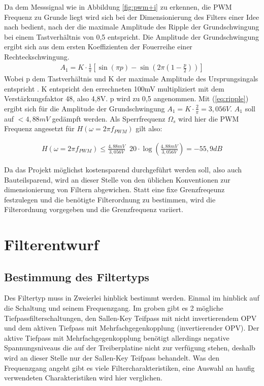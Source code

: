 Da dem Messsignal wie in Abbildung \ref{fig:pwm+i} zu erkennen, die PWM Frequenz zu Grunde liegt wird sich bei der Dimensionierung des Filters einer Idee nach \cite{Alter2008} bedient, nach der die maximale Amplitude des Ripple der Grundschwingung bei einem
Tastverhältnis von 0,5 entspricht. Die Amplitude der Grundschwingung ergibt sich aus dem ersten Koeffizienten der Fouerreihe einer Rechteckschwingung.
\begin{align}
A_1 = K\cdot \frac{1}{\pi}[\sin(\pi p)-\sin(2\pi(1-\frac{p}{2}))]
\label{eq:ripple}
\end{align}
Wobei p dem Tastverhältnis und K der maximale Amplitude des Ursprungsingals entspricht \cite{Alter2008}. K entspricht den errechneten 100mV multipliziert mit dem Verstärkungsfaktor 48, also 4,8V. p wird zu 0,5
angenommen. Mit (\ref{eq:ripple}) ergibt sich für die Amplitude der Grundschwingung $ A_1 = K\cdot \frac{2}{\pi} = 3,056V$. $A_1$ soll auf $ < 4,88mV$ gedämpft werden.
Als Sperrfrequenz $\Omega_s $ wird hier die PWM Frequenz angesetzt für $H(\omega=2\pi f_{PWM})$ gilt also:

\begin{align}
H(\omega=2\pi f_{PWM}) \le \frac{4,88mV}{3,056V} \mathop{\hat{=}} 20\cdot\log(\frac{4,88mV}{3,056V})= -55,9 dB
\label{eq:daempfung}
\end{align}

Da das Projekt möglichst kostensparend durchgeführt werden soll, also auch Bauteilsparend, wird an dieser Stelle von den üblichen Konventionen zur dimensionierung von Filtern abgewichen.
Statt eine fixe Grenzfreqeunz festzulegen und die benötigte Filterordnung zu bestimmen, wird die Filterordnung vorgegeben und die Grenzfrequenz variiert.

\section{Filterentwurf}

\subsection{Bestimmung des Filtertyps}

Des Filtertyp muss in Zweierlei hinblick bestimmt werden. Einmal im hinblick auf die Schaltung und seinem Frequenzgang.
Im groben gibt es 2 mögliche Tiefpassfilterschaltungen, den Sallen-Key Teifpass mit nicht invertierendem OPV und dem aktiven Tiefpass mit Mehrfachgegenkopplung 
(invertierender OPV). Der aktive Tiefpass mit Mehrfachgegenkopplung benötigt allerdings negative Spannungsniveaus die auf der Treiberplatine nicht zur
verfügung stehen, deshalb wird an dieser Stelle nur der Sallen-Key Teifpass behandelt.
Was den Frequenzgang angeht gibt es viele Filtercharakteristiken, eine Auswahl an haufig verwendeten Charakteristiken wird hier verglichen.

